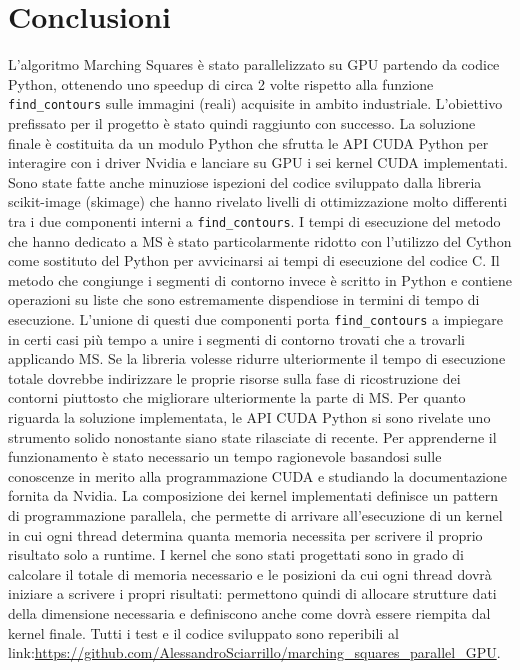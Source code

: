 \documentclass[12pt,a4paper]{report}
\begin{document}
{\chapter{Conclusioni}
L'algoritmo Marching Squares è stato parallelizzato su GPU partendo da codice Python, ottenendo uno speedup di circa 2 volte rispetto alla funzione \verb|find_contours| sulle immagini (reali) acquisite in ambito industriale.
L'obiettivo prefissato per il progetto è stato quindi raggiunto con successo. \newline
La soluzione finale è costituita da un modulo Python che sfrutta le API CUDA Python per interagire con i driver Nvidia e lanciare su GPU i sei kernel CUDA implementati.
Sono state fatte anche minuziose ispezioni del codice sviluppato dalla libreria scikit-image (skimage) che hanno rivelato livelli di ottimizzazione molto differenti tra i due componenti interni a \verb|find_contours|. I tempi di esecuzione del metodo che hanno dedicato a MS è stato particolarmente ridotto con l'utilizzo del Cython come sostituto del Python per avvicinarsi ai tempi di esecuzione del codice C. Il metodo che congiunge i segmenti di contorno invece è scritto in Python e contiene operazioni su liste che sono estremamente dispendiose in termini di tempo di esecuzione. L'unione di questi due componenti porta \verb|find_contours| a impiegare in certi casi più tempo a unire i segmenti di contorno trovati che a trovarli applicando MS. Se la libreria volesse ridurre ulteriormente il tempo di esecuzione totale dovrebbe indirizzare le proprie risorse sulla fase di ricostruzione dei contorni piuttosto che migliorare ulteriormente la parte di MS. \newline
Per quanto riguarda la soluzione implementata, le API CUDA Python si sono rivelate uno strumento solido nonostante siano state rilasciate di recente. Per apprenderne il funzionamento è stato necessario un tempo ragionevole basandosi sulle conoscenze in merito alla programmazione CUDA e studiando la documentazione fornita da Nvidia.\newline
La composizione dei kernel implementati definisce un pattern di programmazione parallela, che permette di arrivare all'esecuzione di un kernel in cui ogni thread determina quanta memoria necessita per scrivere il proprio risultato solo a runtime. I kernel che sono stati progettati sono in grado di calcolare il totale di memoria necessario e le posizioni da cui ogni thread dovrà iniziare a scrivere i propri risultati: permettono quindi di allocare strutture dati della dimensione necessaria e definiscono anche come dovrà essere riempita dal kernel finale. \newline
Tutti i test e il codice sviluppato sono reperibili al link:\newline \url{https://github.com/AlessandroSciarrillo/marching_squares_parallel_GPU}.


}
\end{document}
